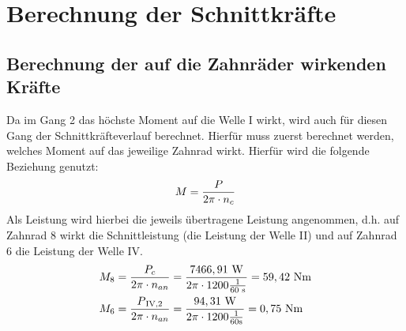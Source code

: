 \newpage
\chapter{Berechnung der Schnittkräfte}
\section{Berechnung der auf die Zahnräder wirkenden Kräfte}

Da im Gang 2 das höchste Moment auf die Welle I wirkt, wird auch für diesen Gang der Schnittkräfteverlauf berechnet. Hierfür muss zuerst berechnet werden, welches Moment auf das jeweilige Zahnrad wirkt. Hierfür wird die folgende Beziehung genutzt:
\[M = \frac{P}{2\pi \cdot n_c}\] 
Als Leistung wird hierbei die jeweils übertragene Leistung angenommen, d.h. auf Zahnrad 8 wirkt die Schnittleistung (die Leistung der Welle II) und auf Zahnrad 6 die Leistung der Welle IV.
	\begin{align*}
M_8 &= \frac{P_c}{2\pi \cdot n_{an}} = \frac{7466,91 \text { W}}{2\pi \cdot 1200 \frac{1}{60 \text{ s}}}= 59,42 \text{ Nm}\\
M_6 &= \frac{P\textsubscript{IV,2}}{2\pi \cdot n_{an}} = \frac{94,31 \text{ W}}{2\pi \cdot 1200 \frac{1}{60 \text{s}}}= 0,75 \text{ Nm}\\
\end{align*}
